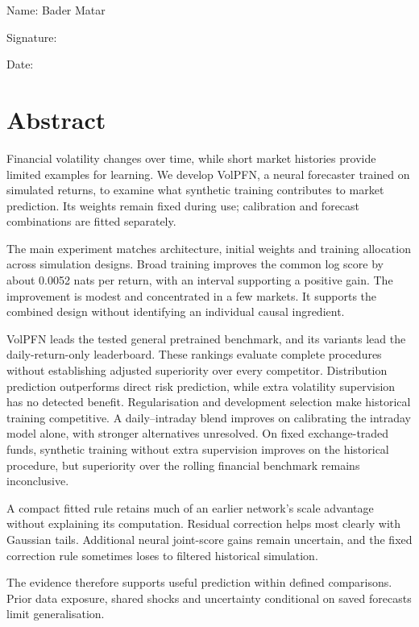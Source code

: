 \vspace{1.5cm}
\noindent Name: Bader Matar

\vspace{0.8cm}
\noindent Signature:

\vspace{0.8cm}
\noindent Date:



\chapter*{Abstract}
Financial volatility changes over time, while short market histories provide limited examples for learning. We develop VolPFN, a neural forecaster trained on simulated returns, to examine what synthetic training contributes to market prediction. Its weights remain fixed during use; calibration and forecast combinations are fitted separately.

The main experiment matches architecture, initial weights and training allocation across simulation designs. Broad training improves the common log score by about 0.0052 nats per return, with an interval supporting a positive gain. The improvement is modest and concentrated in a few markets. It supports the combined design without identifying an individual causal ingredient.

VolPFN leads the tested general pretrained benchmark, and its variants lead the daily-return-only leaderboard. These rankings evaluate complete procedures without establishing adjusted superiority over every competitor. Distribution prediction outperforms direct risk prediction, while extra volatility supervision has no detected benefit. Regularisation and development selection make historical training competitive. A daily--intraday blend improves on calibrating the intraday model alone, with stronger alternatives unresolved. On fixed exchange-traded funds, synthetic training without extra supervision improves on the historical procedure, but superiority over the rolling financial benchmark remains inconclusive.

A compact fitted rule retains much of an earlier network's scale advantage without explaining its computation. Residual correction helps most clearly with Gaussian tails. Additional neural joint-score gains remain uncertain, and the fixed correction rule sometimes loses to filtered historical simulation.

The evidence therefore supports useful prediction within defined comparisons. Prior data exposure, shared shocks and uncertainty conditional on saved forecasts limit generalisation.

